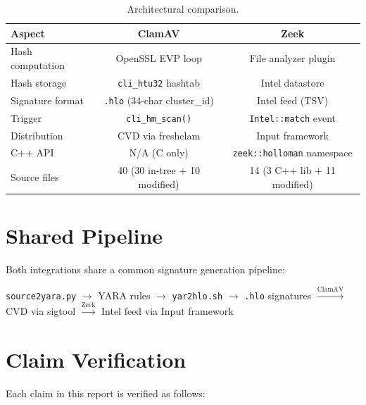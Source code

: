 \documentclass[11pt,a4paper]{article}
\begin{document}
\begin{table}[h]
\centering
\begin{tabular}{lcc}
\toprule
Aspect & ClamAV & Zeek \\
\midrule
Hash computation & OpenSSL EVP loop & File analyzer plugin \\
Hash storage & \texttt{cli\_htu32} hashtab & Intel datastore \\
Signature format & \texttt{.hlo} (34-char cluster\_id) & Intel feed (TSV) \\
Trigger & \texttt{cli\_hm\_scan()} & \texttt{Intel::match} event \\
Distribution & CVD via freshclam & Input framework \\
C++ API & N/A (C only) & \texttt{zeek::holloman} namespace \\
Source files & 40 (30 in-tree + 10 modified) & 14 (3 C++ lib + 11 modified) \\
\bottomrule
\end{tabular}
\caption{Architectural comparison.}
\label{tab:comparison}
\end{table}

\section{Shared Pipeline}

Both integrations share a common signature generation pipeline:

\begin{center}
\texttt{source2yara.py} $\rightarrow$ YARA rules
$\rightarrow$ \texttt{yar2hlo.sh} $\rightarrow$ \texttt{.hlo} signatures
$\xrightarrow{\text{ClamAV}}$ CVD via sigtool
$\xrightarrow{\text{Zeek}}$ Intel feed via Input framework
\end{center}

\section{Claim Verification}

Each claim in this report is verified as follows:
\end{document}
